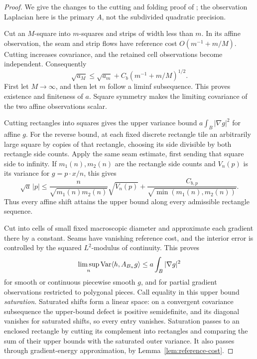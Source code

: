 \begin{proof}
We give the changes to the cutting and folding proof of
; the observation Laplacian here is
the primary \(A\), not the subdivided quadratic precision.

Cut an \(M\)-square into \(m\)-squares and strips of width less than
\(m\). In its affine observation, the seam and strip flows have
reference cost \(O(m^{-1}+m/M)\). Cutting increases covariance, and
the retained cell observations become independent. Consequently
\begin{equation}
 \sqrt{a_M}\le\sqrt{a_m}
             +C_b(m^{-1}+m/M)^{1/2}.
 \label{eq:cut-coefficient}
\end{equation}
First let \(M\to\infty\), and then let \(m\) follow a liminf
subsequence. This proves existence and finiteness of \(a\).
Square symmetry makes the limiting covariance of the two affine
observations scalar.

Cutting rectangles into squares gives the upper variance bound
\(a\int_B|\nabla g|^2\) for affine \(g\).
For the reverse bound, at each fixed discrete rectangle tile an
arbitrarily large square by copies of that rectangle, choosing its
side divisible by both rectangle side counts. Apply the same seam
estimate, first sending that square side to infinity. If
\(m_1(n),m_2(n)\) are the rectangle side counts and \(V_n(p)\) is its
variance for \(g=p\cdot x/n\), this gives
\[
 \sqrt a\,|p|
 \le\frac{n}{\sqrt{m_1(n)m_2(n)}}\sqrt{V_n(p)}
       +\frac{C_{b,p}}{\sqrt{\min(m_1(n),m_2(n))}}.
\]
Thus every affine shift attains the upper bound along every
admissible rectangle sequence.

Cut into cells of small fixed macroscopic diameter and approximate
each gradient there by a constant. Seams have vanishing reference
cost, and the interior error is controlled by the squared
\(L^2\)-modulus of continuity. This proves
\begin{equation}
 \limsup_n\operatorname{Var}\langle h,A_{B_n}g\rangle
       \le a\int_B|\nabla g|^2
 \label{eq:partial-energy-upper}
\end{equation}
for smooth or continuous piecewise smooth \(g\), and for partial
gradient observations restricted to polygonal pieces.
Call equality in this upper bound \emph{saturation}.
Saturated shifts form a linear space: on a convergent covariance
subsequence the upper-bound defect is positive semidefinite, and
its diagonal vanishes for saturated shifts, so every entry vanishes.
Saturation passes to an enclosed rectangle by cutting its complement
into rectangles and comparing the sum of their upper bounds with
the saturated outer variance. It also passes through gradient-energy
approximation, by Lemma~\ref{lem:reference-cost}.


\end{proof}
